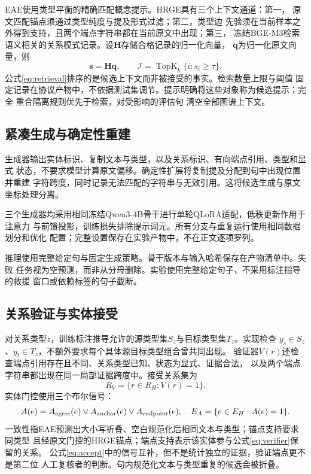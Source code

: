 \documentclass[12pt,a4paper,fontset=none]{ctexart}
\begin{document}
EAE使用类型平衡的精确匹配概念提示。HRGE具有三个上下文通道：第一，
原文匹配锚点须通过类型纯度与提及形式过滤；第二，类型边
先验须在当前样本之外得到支持，且两个端点字符串都在当前原文中出现；第三，
冻结BGE-M3检索语义相关的关系模式记录。设$\mathbf H$存储合格记录的归一化向量，
$\mathbf q$为归一化原文向量，则
\begin{equation}
\mathbf{s}=\mathbf{H}\mathbf{q},\qquad
\mathcal I=\operatorname{TopK}_{k}\{i:s_i\geq\tau\}.
\label{eq:retrieval}
\end{equation}
公式\eqref{eq:retrieval}排序的是候选上下文而非被接受的事实。检索数量上限与阈值
固定记录在协议产物中，不依据测试集调节。提示明确将这些对象称为候选提示；完全
重合隔离规则优先于检索，对受影响的评估句
清空全部图谱上下文。

\subsection{紧凑生成与确定性重建}
生成器输出实体标识、复制文本与类型，以及关系标识、有向端点引用、类型和显式
状态，不要求模型计算原文偏移。确定性扩展将复制提及分配到句中出现位置并重建
字符跨度，同时记录无法匹配的字符串与无效引用。这将候选生成与原文坐标处理分离。

三个生成器均采用相同冻结Qwen3-4B骨干进行单轮QLoRA适配，低秩更新作用于注意力
与前馈投影，训练损失排除提示词元。所有分支与重复运行使用相同数据划分和优化
配置；完整设置保存在实验产物中，不在正文逐项罗列。

推理使用完整给定句与固定生成策略。骨干版本与输入哈希保存在产物清单中。失败
任务视为空预测，而非从分母删除。实验使用完整给定句子，不采用标注指导的救援
窗口或依赖标签的句子截断。

\subsection{关系验证与实体接受}
对关系类型$z$，训练标注推导允许的源类型集$S_z$与目标类型集$T_z$。实现检查
$y_s\in S_z$、$y_t\in T_z$，不额外要求每个具体源目标类型组合曾共同出现。
验证器$V(r)$还检查端点引用存在且不同、关系类型已知、状态为显式、证据合法，
以及两个端点字符串都出现在同一局部证据跨度中。接受关系集为
\begin{equation}
R_V=\{r\in R_H:V(r)=1\}.
\label{eq:verifier}
\end{equation}
实体门控使用三个布尔信号：
\begin{equation}
A(e)=A_{\rm agree}(e)\lor A_{\rm anchor}(e)\lor A_{\rm endpoint}(e),
\quad E_A=\{e\in E_H:A(e)=1\}.
\label{eq:accept}
\end{equation}
一致性指EAE预测出大小写折叠、空白规范化后相同文本与类型；锚点支持要求同类型
且经原文门控的HRGE锚点；端点支持表示该实体参与公式\eqref{eq:verifier}保留的关系。
公式\eqref{eq:accept}中的信号互补，但不是统计独立的证据，验证端点更不是第二位
人工复核者的判断。句内规范化文本与类型重复的候选会被折叠。
\end{document}
